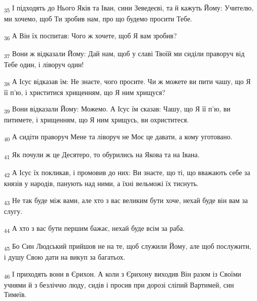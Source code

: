 \begin{tcolorbox}
\textsubscript{35} І підходять до Нього Яків та Іван, сини Зеведеєві, та й кажуть Йому: Учителю, ми хочемо, щоб Ти зробив нам, про що будемо просити Тебе.
\end{tcolorbox}
\begin{tcolorbox}
\textsubscript{36} А Він їх поспитав: Чого ж хочете, щоб Я вам зробив?
\end{tcolorbox}
\begin{tcolorbox}
\textsubscript{37} Вони ж відказали Йому: Дай нам, щоб у славі Твоїй ми сиділи праворуч від Тебе один, і ліворуч один!
\end{tcolorbox}
\begin{tcolorbox}
\textsubscript{38} А Ісус відказав їм: Не знаєте, чого просите. Чи ж можете ви пити чашу, що Я її п'ю, і христитися хрищенням, що Я ним хрищуся?
\end{tcolorbox}
\begin{tcolorbox}
\textsubscript{39} Вони відказали Йому: Можемо. А Ісус їм сказав: Чашу, що Я її п'ю, ви питимете, і хрищенням, що Я ним хрищусь, ви охриститеся.
\end{tcolorbox}
\begin{tcolorbox}
\textsubscript{40} А сидіти праворуч Мене та ліворуч не Моє це давати, а кому уготовано.
\end{tcolorbox}
\begin{tcolorbox}
\textsubscript{41} Як почули ж це Десятеро, то обурились на Якова та на Івана.
\end{tcolorbox}
\begin{tcolorbox}
\textsubscript{42} А Ісус їх покликав, і промовив до них: Ви знаєте, що ті, що вважають себе за князів у народів, панують над ними, а їхні вельможі їх тиснуть.
\end{tcolorbox}
\begin{tcolorbox}
\textsubscript{43} Не так буде між вами, але хто з вас великим бути хоче, нехай буде він вам за слугу.
\end{tcolorbox}
\begin{tcolorbox}
\textsubscript{44} А хто з вас бути першим бажає, нехай буде всім за раба.
\end{tcolorbox}
\begin{tcolorbox}
\textsubscript{45} Бо Син Людський прийшов не на те, щоб служили Йому, але щоб послужити, і душу Свою дати на викуп за багатьох.
\end{tcolorbox}
\begin{tcolorbox}
\textsubscript{46} І приходять вони в Єрихон. А коли з Єрихону виходив Він разом із Своїми учнями й з безліччю люду, сидів і просив при дорозі сліпий Вартимей, син Тимеїв.
\end{tcolorbox}
